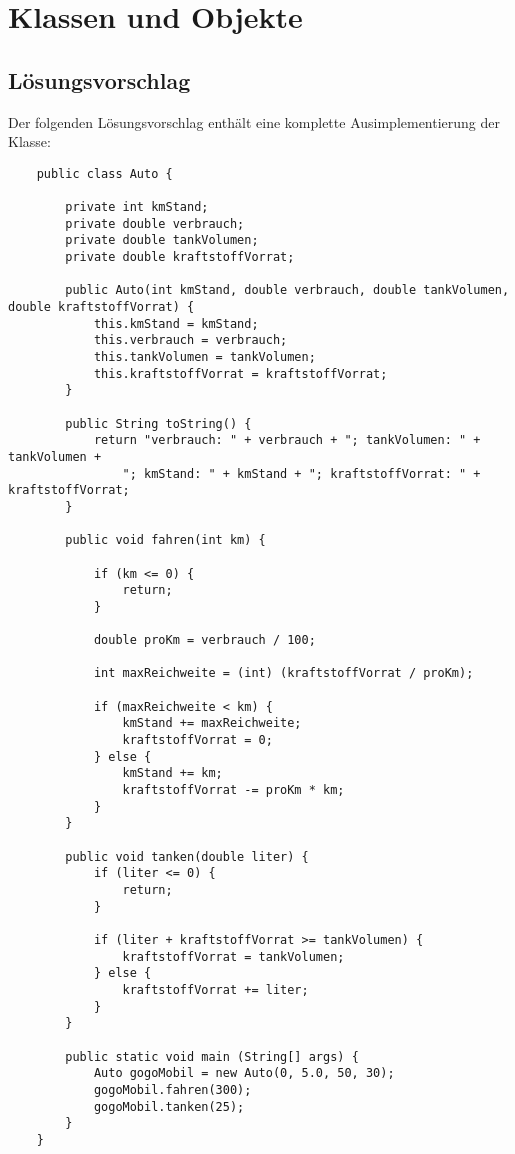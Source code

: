 \chapter{Klassen und Objekte}

\section{Lösungsvorschlag}

Der folgenden Lösungsvorschlag enthält eine komplette Ausimplementierung der Klasse:

\begin{verbatim}
    public class Auto {

        private int kmStand;
        private double verbrauch;
        private double tankVolumen;
        private double kraftstoffVorrat;

        public Auto(int kmStand, double verbrauch, double tankVolumen, double kraftstoffVorrat) {
            this.kmStand = kmStand;
            this.verbrauch = verbrauch;
            this.tankVolumen = tankVolumen;
            this.kraftstoffVorrat = kraftstoffVorrat;
        }

        public String toString() {
            return "verbrauch: " + verbrauch + "; tankVolumen: " + tankVolumen +
                "; kmStand: " + kmStand + "; kraftstoffVorrat: " + kraftstoffVorrat;
        }

        public void fahren(int km) {

            if (km <= 0) {
                return;
            }

            double proKm = verbrauch / 100;

            int maxReichweite = (int) (kraftstoffVorrat / proKm);

            if (maxReichweite < km) {
                kmStand += maxReichweite;
                kraftstoffVorrat = 0;
            } else {
                kmStand += km;
                kraftstoffVorrat -= proKm * km;
            }
        }

        public void tanken(double liter) {
            if (liter <= 0) {
                return;
            }

            if (liter + kraftstoffVorrat >= tankVolumen) {
                kraftstoffVorrat = tankVolumen;
            } else {
                kraftstoffVorrat += liter;
            }
        }

        public static void main (String[] args) {
            Auto gogoMobil = new Auto(0, 5.0, 50, 30);
            gogoMobil.fahren(300);
            gogoMobil.tanken(25);
        }
    }
\end{verbatim}\\

